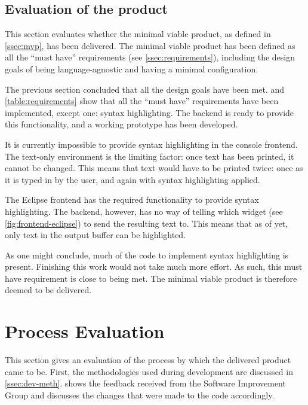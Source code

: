 \subsection{Evaluation of the product}
\label{ssec:eval-product}

This section evaluates whether the minimal viable product, as defined in
\cref{ssec:mvp}, has been delivered. The minimal viable product has been defined
as all the ``must have'' requirements (see \cref{ssec:requirements}), including
the design goals of being language-agnostic and having a minimal configuration.

The previous section concluded that all the design goals have been met.
 and \cref{table:requirements} show that all the
``must have'' requirements have been implemented, except one: syntax
highlighting. The backend is ready to provide this functionality, and a working
prototype has been developed.

It is currently impossible to provide syntax highlighting in the console
frontend. The text-only environment is the limiting factor: once text has been
printed, it cannot be changed. This means that text would have to be printed
twice: once as it is typed in by the user, and again with syntax highlighting
applied.

The Eclipse frontend has the required functionality to provide syntax
highlighting. The backend, however, has no way of telling which widget (see
\cref{fig:frontend-eclipse}) to send the resulting text to. This means that as
of yet, only text in the output buffer can be highlighted.

As one might conclude, much of the code to implement syntax highlighting is
present. Finishing this work would not take much more effort. As such, this must
have requirement is close to being met. The minimal viable product is therefore
deemed to be delivered.

\section{Process Evaluation}
\label{sec:process-evaluation}

This section gives an evaluation of the process by which the delivered product
came to be. First, the methodologies used during development are discussed in
\cref{ssec:dev-meth}.  shows the feedback received from the
Software Improvement Group and discusses the changes that were made to the code
accordingly.

